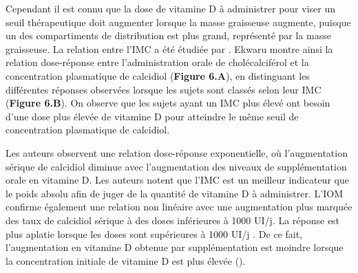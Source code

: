 \documentclass[
  a4paper,
  DIV=11,
  numbers=noendperiod,
  listof=totoc]{scrreprt}
\begin{document}
Cependant il est connu que la dose de vitamine D à administrer pour
viser un seuil thérapeutique doit augmenter lorsque la masse graisseuse
augmente, puisque un des compartiments de distribution est plus grand,
représenté par la masse graisseuse. La relation entre l'\ac{IMC} a été
étudiée par \textcite{Ekwaru.2014}. Ekwaru montre ainsi la relation
dose-réponse entre l'administration orale de cholécalciférol et la
concentration plasmatique de calcidiol (\textbf{Figure 6.A}), en
distinguant les différentes réponses observées lorsque les sujets sont
classés selon leur \ac{IMC} (\textbf{Figure 6.B}). On observe que les
sujets ayant un \ac{IMC} plus élevé ont besoin d'une dose plus élevée de
vitamine D pour atteindre le même seuil de concentration plasmatique de
calcidiol.

Les auteurs observent une relation dose-réponse exponentielle, où
l'augmentation sérique de calcidiol diminue avec l'augmentation des
niveaux de supplémentation orale en vitamine D. Les auteurs notent que
l'\ac{IMC} est un meilleur indicateur que le poids absolu afin de juger
de la quantité de vitamine D à administrer. L'\ac{IOM} confirme
également une relation non linéaire avec une augmentation plus marquée
des taux de calcidiol sérique à des doses inférieures à 1000 UI/j. La
réponse est plus aplatie lorsque les doses sont supérieures à 1000 UI/j
\autocite{IOM.2011,Garland.2011}. De ce fait, l'augmentation en vitamine
D obtenue par supplémentation est moindre lorsque la concentration
initiale de vitamine D est plus élevée ().
\end{document}
